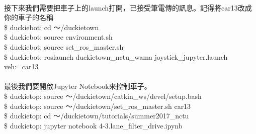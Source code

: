 \documentclass{article}
\begin{document}
\\
接下來我們需要把車子上的launch打開，已接受筆電傳的訊息。記得將car13改成你的車子的名稱
\\\$ duckiebot: cd ～/duckietown
\\\$ duckiebot: source environment.sh
\\\$ duckiebot: source set\_ros\_master.sh
\\\$ duckiebot: roslaunch duckietown\_nctu\_wama joystick\_jupyter.launch veh:=car13
\\\\最後我們要開啟Jupyter Notebook來控制車子。
\\\$ duckietop: source ～/duckietown/catkin\_ws/devel/setup.bash
\\\$ duckietop: source ～/duckietown/set\_ros\_master.sh car13
\\\$ duckietop: cd ～/duckietown/tutorials/summer2017\_nctu
\\\$ duckietop: jupyter notebook 4-3.lane\_filter\_drive.ipynb
\end{document}
